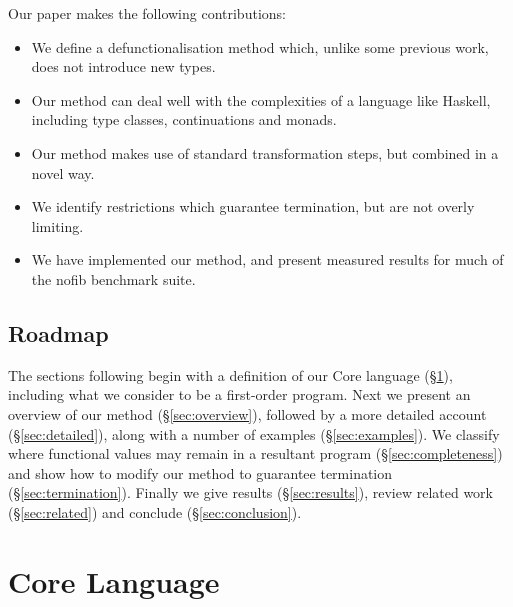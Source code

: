 \documentclass[preprint]{sigplanconf}
\begin{document}
Our paper makes the following contributions:

\begin{itemize}
\item We define a defunctionalisation method which, unlike some previous work, does not introduce new types.
\item Our method can deal well with the complexities of a language like Haskell, including type classes, continuations and monads.
\item Our method makes use of standard transformation steps, but combined in a novel way.
\item We identify restrictions which guarantee termination, but are not overly limiting.
\item We have implemented our method, and present measured results for much of the nofib benchmark suite.
\end{itemize}

\subsection{Roadmap}

The sections following begin with a definition of our Core language (\S\ref{sec:core}), including what we consider to be a first-order program. Next we present an overview of our method (\S\ref{sec:overview}), followed by a more detailed account (\S\ref{sec:detailed}), along with a number of examples (\S\ref{sec:examples}). We classify where functional values may remain in a resultant program (\S\ref{sec:completeness}) and show how to modify our method to guarantee termination (\S\ref{sec:termination}). Finally we give results (\S\ref{sec:results}), review related work (\S\ref{sec:related}) and conclude (\S\ref{sec:conclusion}).

\section{Core Language}
\label{sec:core}
\end{document}
